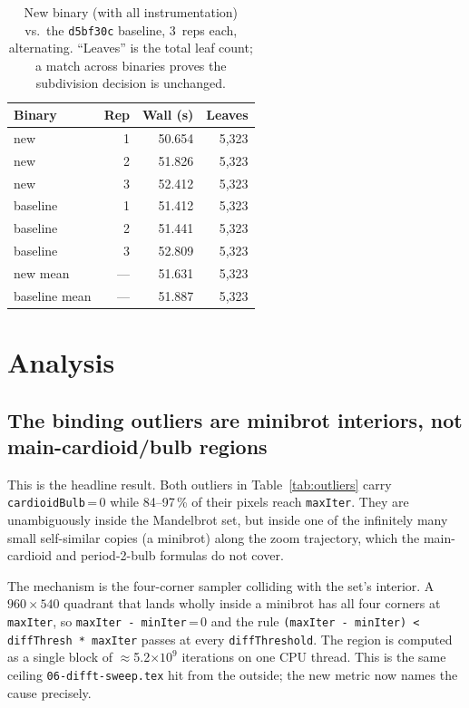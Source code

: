 \documentclass[
	english,
	letterpaper, oneside
]{article}
\begin{document}
\begin{table}[H]
    \centering
    \caption{New binary (with all instrumentation) vs.\ the \texttt{d5bf30c}
             baseline, 3~reps each, alternating. ``Leaves'' is the total leaf
             count; a match across binaries proves the subdivision decision is
             unchanged.}
    \label{tab:ab}
    \begin{tabular}{lrrr}
        \hline
        Binary & Rep & Wall (s) & Leaves \\
        \hline
        new      & 1 & 50.654 & 5{,}323 \\
        new      & 2 & 51.826 & 5{,}323 \\
        new      & 3 & 52.412 & 5{,}323 \\
        baseline & 1 & 51.412 & 5{,}323 \\
        baseline & 2 & 51.441 & 5{,}323 \\
        baseline & 3 & 52.809 & 5{,}323 \\
        \hline
        new mean      & --- & 51.631 & 5{,}323 \\
        baseline mean & --- & 51.887 & 5{,}323 \\
        \hline
    \end{tabular}
\end{table}

\section{Analysis}

\subsection{The binding outliers are minibrot interiors, not main-cardioid/bulb regions}

This is the headline result. Both outliers in Table~\ref{tab:outliers} carry
\texttt{cardioidBulb}\,=\,0 while 84--97\,\% of their pixels reach
\texttt{maxIter}. They are unambiguously inside the Mandelbrot set, but
inside one of the infinitely many small self-similar copies (a minibrot) along
the zoom trajectory, which the main-cardioid and period-2-bulb formulas do not
cover.

The mechanism is the four-corner sampler colliding with the set's interior. A
$960\times540$ quadrant that lands wholly inside a minibrot has all four corners
at \texttt{maxIter}, so \texttt{maxIter\,-\,minIter}\,=\,0 and the rule
\texttt{(maxIter - minIter) < diffThresh * maxIter} passes at every
\texttt{diffThreshold}. The region is computed as a single block of $\approx$5.2$\times10^9$
iterations on one CPU thread. This is the same ceiling \texttt{06-difft-sweep.tex}
hit from the outside; the new metric now names the cause precisely.
\end{document}
